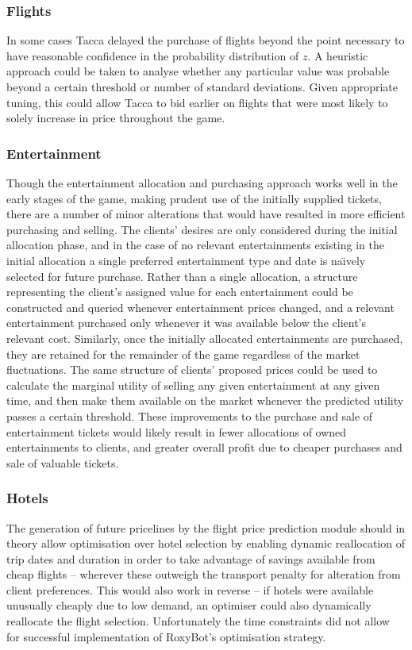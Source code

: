 \documentclass[oribibl]{llncs}
\begin{document}
\subsubsection{Flights}
In some cases Tacca delayed the purchase of flights beyond the point necessary to have reasonable confidence in the probability distribution of $z$. A heuristic approach could be taken to analyse whether any particular value was probable beyond a certain threshold or number of standard deviations. Given appropriate tuning, this could allow Tacca to bid earlier on flights that were most likely to solely increase in price throughout the game.

\subsubsection{Entertainment}
Though the entertainment allocation and purchasing approach works well in the early stages of the game, making prudent use of the initially supplied tickets, there are a number of minor alterations that would have resulted in more efficient purchasing and selling. The clients' desires are only considered during the initial allocation phase, and in the case of no relevant entertainments existing in the initial allocation a single preferred entertainment type and date is na\"{\i}vely selected for future purchase. Rather than a single allocation, a structure representing the client's assigned value for each entertainment could be constructed and queried whenever entertainment prices changed, and a relevant entertainment purchased only whenever it was available below the client's relevant cost. Similarly, once the initially allocated entertainments are purchased, they are retained for the remainder of the game regardless of the market fluctuations. The same structure of clients' proposed prices could be used to calculate the marginal utility of selling any given entertainment at any given time, and then make them available on the market whenever the predicted utility passes a certain threshold. These improvements to the purchase and sale of entertainment tickets would likely result in fewer allocations of owned entertainments to clients, and greater overall profit due to cheaper purchases and sale of valuable tickets.

\subsubsection{Hotels}
The generation of future pricelines by the flight price prediction module should in theory allow optimisation over hotel selection by enabling dynamic reallocation of trip dates and duration in order to take advantage of savings available from cheap flights -- wherever these outweigh the transport penalty for alteration from client preferences. This would also work in reverse -- if hotels were available unusually cheaply due to low demand, an optimiser could also dynamically reallocate the flight selection. Unfortunately the time constraints did not allow for successful implementation of RoxyBot's optimisation strategy.
\end{document}
